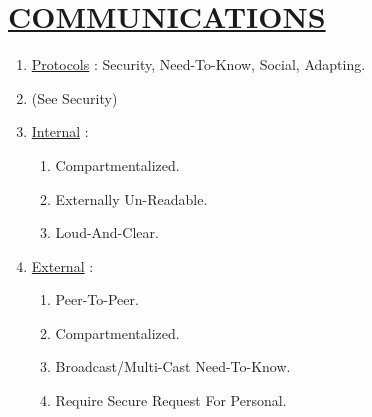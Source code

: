 \documentclass[11pt]{article}
\begin{document}
\section*{\ul{COMMUNICATIONS}}
\begin{enumerate}
	\item[] \ul{Protocols} : Security, Need-To-Know, Social, Adapting.
	\item[] (See Security)
	
	\item[] \ul{Internal} :
	\begin{enumerate}
		\item[] Compartmentalized.
		\item[] Externally Un-Readable.
		\item[] Loud-And-Clear.
	\end{enumerate}

	\item[] \ul{External} :
	\begin{enumerate}
		\item[] Peer-To-Peer.
		\item[] Compartmentalized.
		\item[] Broadcast/Multi-Cast Need-To-Know.
		\item[] Require Secure Request For Personal.
	\end{enumerate}
\end{enumerate}
\end{document}
